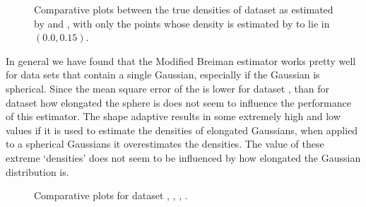 \begin{figure}
\begin{subfigure}{0.7\columnwidth}
				\caption{\sambe}
				\label{fig:results:baakman5:noOUtliers:sambe}
			\end{subfigure}	
			\caption{Comparative plots between the true densities of dataset \baakmanFive as estimated by  \mbe and  \sambe, with only the points whose density is estimated by \sambe to lie in $\left(\num{0.0}, \num{0.15} \right)$.}
			\label{fig:results:baakman5:noOutliers}
		\end{figure}

		In general we have found that the Modified Breiman estimator works pretty well for data sets that contain a single Gaussian, especially if the Gaussian is spherical. Since the mean square error of the \mbe is lower for dataset \baakmanFive, than for dataset \baakmanFour how elongated the sphere is does not seem to influence the performance of this estimator. 
		The shape adaptive \mbe results in some extremely high and low values if it is used to estimate the densities of elongated Gaussians, when applied to a spherical Gaussians it overestimates the densities. The value of these extreme `densities' does not seem to be influenced by how elongated the Gaussian distribution is.


	\begin{figure}
		\centering
		
		\caption{Comparative plots for dataset \ferdosiTwo, \ferdosiThree, \baakmanTwo, \baakmanThree.}
		\label{fig:4:resuts:multiSphere}
	\end{figure}

